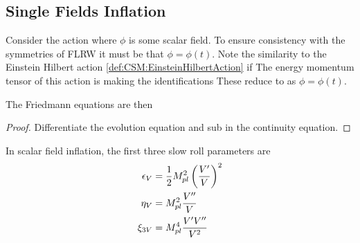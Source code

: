 \documentclass{article}
\begin{document}
\subsection{Single Fields Inflation}

Consider the action
where $\phi$ is some scalar field. To ensure consistency with the symmetries of FLRW it must be that $\phi = \phi(t)$.  Note the similarity to the Einstein Hilbert action \ref{def:CSM:EinsteinHilbertAction} if 
The energy momentum tensor of this action is 
making the identifications 
These reduce to 
as $\phi=\phi(t)$. 

The Friedmann equations are then 

\begin{prop}\label{prop:CSM:1}
\end{prop}
\begin{proof}
Differentiate the evolution equation and sub in the continuity equation. 
\end{proof}

\begin{definition}
In scalar field inflation, the first three slow roll parameters are 
\begin{align}\label{eq:CSM:13}
\epsilon_V &= \frac{1}{2} M_{pl}^2 \left( \frac{V^\prime}{V} \right)^2 \\
\eta_V &= M_{pl}^2 \frac{V^{\prime\prime}}{V} \\
\xi_{3V} &= M_{pl}^4 \frac{V^\prime V^{\prime\prime}}{V^2}
\end{align}
\end{definition}
\end{document}
